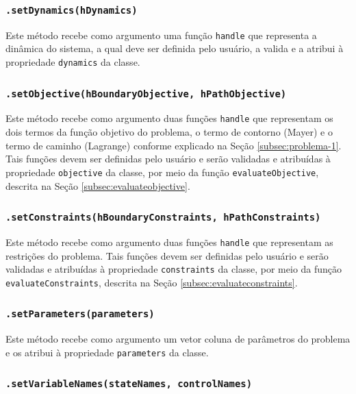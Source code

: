 \subsubsection{\texttt{.setDynamics(hDynamics)}}
\label{subsubsec:setdynamics}

Este método recebe como argumento uma função \texttt{handle} que representa a dinâmica do sistema, a qual deve ser definida pelo usuário, a valida e a atribui à propriedade \texttt{dynamics} da classe.


\subsubsection{\texttt{.setObjective(hBoundaryObjective, hPathObjective)}}
\label{subsubsec:setobjective}

Este método recebe como argumento duas funções \texttt{handle} que representam os dois termos da função objetivo do problema, o termo de contorno (Mayer) e o termo de caminho (Lagrange) conforme explicado na Seção \ref{subsec:problema-1}. Tais funções devem ser definidas pelo usuário e serão validadas e atribuídas à propriedade \texttt{objective} da classe, por meio da função \texttt{evaluateObjective}, descrita na Seção \ref{subsec:evaluateobjective}.

\subsubsection{\texttt{.setConstraints(hBoundaryConstraints, hPathConstraints)}}
\label{subsubsec:setconstraints}

Este método recebe como argumento duas funções \texttt{handle} que representam as restrições do problema. Tais funções devem ser definidas pelo usuário e serão validadas e atribuídas à propriedade \texttt{constraints} da classe, por meio da função \texttt{evaluateConstraints}, descrita na Seção \ref{subsec:evaluateconstraints}.

\subsubsection{\texttt{.setParameters(parameters)}}
\label{subsubsec:setparameters}

Este método recebe como argumento um vetor coluna de parâmetros do problema e os atribui à propriedade \texttt{parameters} da classe.

\subsubsection{\texttt{.setVariableNames(stateNames, controlNames)}}
\label{subsubsec:setvariablenames}

